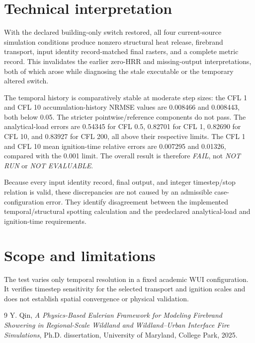 \section{Technical interpretation}
With the declared building-only switch restored, all four current-source simulation conditions produce nonzero structural heat release, firebrand transport, input identity record-matched final rasters, and a complete metric record.  This invalidates the earlier zero-HRR and missing-output interpretations, both of which arose while diagnosing the stale executable or the temporary altered switch.

The temporal history is comparatively stable at moderate step sizes: the CFL 1 and CFL 10 accumulation-history NRMSE values are 0.008466 and 0.008443, both below 0.05.  The stricter pointwise/reference components do not pass.  The analytical-load errors are 0.54345 for CFL 0.5, 0.82701 for CFL 1, 0.82690 for CFL 10, and 0.83927 for CFL 200, all above their respective limits.  The CFL 1 and CFL 10 mean ignition-time relative errors are 0.007295 and 0.01326, compared with the 0.001 limit.  The overall result is therefore \emph{FAIL}, not \emph{NOT RUN} or \emph{NOT EVALUABLE}.

Because every input identity record, final output, and integer timestep/stop relation is valid, these discrepancies are not caused by an admissible case-configuration error.  They identify disagreement between the implemented temporal/structural spotting calculation and the predeclared analytical-load and ignition-time requirements.

\section{Scope and limitations}
The test varies only temporal resolution in a fixed academic WUI configuration. It verifies timestep sensitivity for the selected transport and ignition scales and does not establish spatial convergence or physical validation.

\begin{thebibliography}{9}
Y. Qin, \emph{A Physics-Based Eulerian Framework for Modeling Firebrand
Showering in Regional-Scale Wildland and Wildland--Urban Interface Fire
Simulations}, Ph.D. dissertation, University of Maryland, College Park, 2025.
\end{thebibliography}
